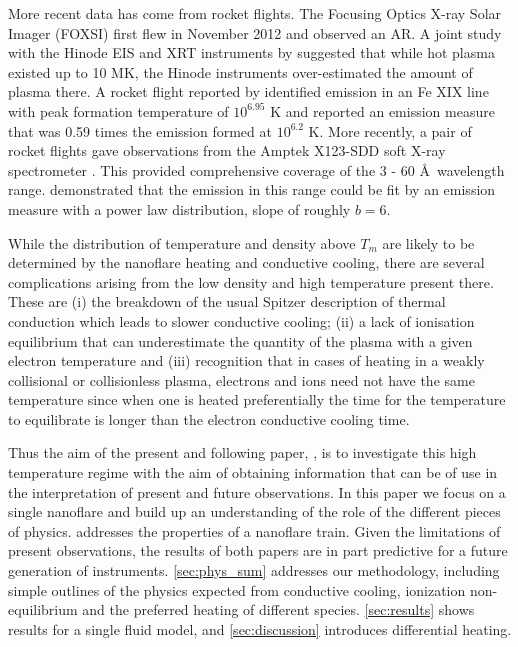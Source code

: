 \documentclass[apj]{emulateapj}
\newcommand{\ang}{\AA~}
\begin{document}
%
	\par More recent data has come from rocket flights. The Focusing Optics X-ray Solar Imager (FOXSI) \citep{krucker_focusing_2011} first flew in November 2012 and observed an AR. A joint study with the Hinode EIS and XRT instruments by \citet{ishikawa_constraining_2014} suggested that while hot plasma existed up to 10 MK, the Hinode instruments over-estimated the amount of plasma there. A rocket flight reported by \citet{brosius_pervasive_2014} identified emission in an Fe XIX line with peak formation temperature of $10^{6.95}$ K and reported an emission measure that was 0.59 times the emission formed at $10^{6.2}$ K. More recently, a pair of rocket flights gave observations from the Amptek X123-SDD soft X-ray spectrometer \citep{caspi_new_2015}. This provided comprehensive coverage of the 3 - 60 \ang wavelength range. \citeauthor{caspi_new_2015} demonstrated that the emission in this range could be fit by an emission measure with a power law distribution, slope of roughly $b = 6$. 
%
	\par While the distribution of temperature and density above $T_m$ are likely to be determined by the nanoflare heating and conductive cooling, there are several complications arising from the low density and high temperature present there. These are (i) the breakdown of the usual Spitzer description of thermal conduction which leads to slower conductive cooling; (ii) a lack of ionisation equilibrium that can underestimate the quantity of the plasma with a given electron temperature and (iii) recognition that in cases of heating in a weakly collisional or collisionless plasma, electrons and ions need not have the same temperature since when one is heated preferentially the time for the temperature to equilibrate is longer than the electron conductive cooling time.
%
	\par Thus the aim of the present and following paper, \citet[in preparation]{barnes_inference_2016-1} , is to investigate this high temperature regime with the aim of obtaining information that can be of use in the interpretation of present and future observations. In this paper we focus on a single nanoflare and build up an understanding of the role of the different pieces of physics.  addresses the properties of a nanoflare train. Given the limitations of present observations, the results of both papers are in part predictive for a future generation of instruments. \autoref{sec:phys_sum} addresses our methodology, including simple outlines of the physics expected from conductive cooling, ionization non-equilibrium and the preferred heating of different species. \autoref{sec:results} shows results for a single fluid model, and \autoref{sec:discussion} introduces differential heating.
	
\end{document}
